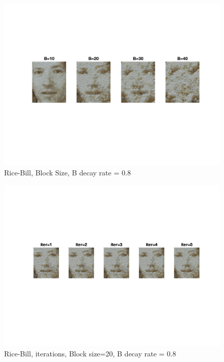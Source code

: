 \documentclass[10pt,twocolumn,letterpaper]{article}
\begin{document}
\begin{figure}[h]
    \begin{center}
    \includegraphics[trim={2cm 6cm 2cm 4cm}, clip, scale=0.9]{../results/bsize/res_rice_bill_bdr_0_800000_iter_5.png}
    \end{center}
    \vspace{-0.2em}
    \caption{Rice-Bill, Block Size, B decay rate = 0.8}
    \label{fig:rice_bill_bs}
\end{figure}

\begin{figure}[h]
    \begin{center}
    \includegraphics[trim={2cm 6cm 2cm 4cm}, clip, scale=0.9]{../results/iters/res_rice_bill_b_20_bdr_0_800000.png}
    \end{center}
    \vspace{-0.2em}
    \caption{Rice-Bill, iterations, Block size=20, B decay rate = 0.8}
    \label{fig:rice_bill_iter}
\end{figure}
\end{document}
